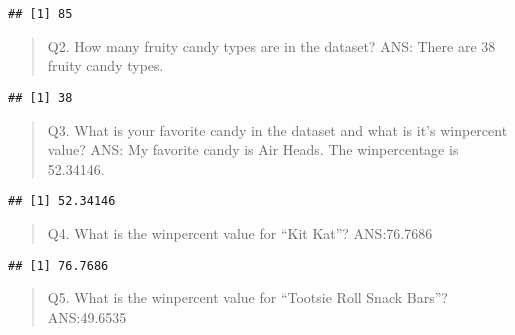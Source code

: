 \documentclass[
]{article}
\newenvironment{Shaded}{\begin{snugshade}}{\end{snugshade}}
\newcommand{\DecValTok}[1]{\textcolor[rgb]{0.00,0.00,0.81}{#1}}
\newcommand{\FunctionTok}[1]{\textcolor[rgb]{0.13,0.29,0.53}{\textbf{#1}}}
\newcommand{\NormalTok}[1]{#1}
\newcommand{\SpecialCharTok}[1]{\textcolor[rgb]{0.81,0.36,0.00}{\textbf{#1}}}
\newcommand{\StringTok}[1]{\textcolor[rgb]{0.31,0.60,0.02}{#1}}
\begin{document}
\begin{verbatim}
## [1] 85
\end{verbatim}

\begin{quote}
Q2. How many fruity candy types are in the dataset? ANS: There are 38
fruity candy types.
\end{quote}

\begin{Shaded}
\end{Shaded}

\begin{verbatim}
## [1] 38
\end{verbatim}

\begin{quote}
Q3. What is your favorite candy in the dataset and what is it's
winpercent value? ANS: My favorite candy is Air Heads. The winpercentage
is 52.34146.
\end{quote}

\begin{Shaded}
\end{Shaded}

\begin{verbatim}
## [1] 52.34146
\end{verbatim}

\begin{quote}
Q4. What is the winpercent value for ``Kit Kat''? ANS:76.7686
\end{quote}

\begin{Shaded}
\end{Shaded}

\begin{verbatim}
## [1] 76.7686
\end{verbatim}

\begin{quote}
Q5. What is the winpercent value for ``Tootsie Roll Snack Bars''?
ANS:49.6535
\end{quote}
\end{document}
